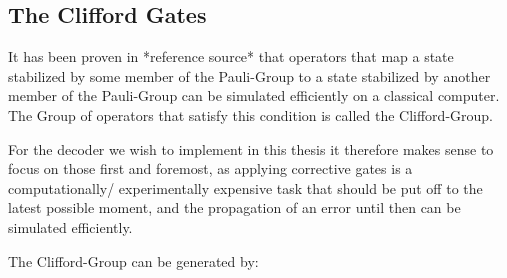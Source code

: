 \subsection{The Clifford Gates}

It has been proven in *reference source* that operators that 
map a state stabilized by some member of the Pauli-Group to 
a state stabilized by another member of the Pauli-Group can be simulated efficiently
on a classical computer. The Group of operators that satisfy
this condition is called the Clifford-Group.

For the decoder we wish to implement in
this thesis it therefore makes sense to focus on those first and
foremost, as applying corrective gates is a computationally/
experimentally expensive task that should be put off to the latest
possible moment, and the propagation of an error until then can be
simulated efficiently. 

The Clifford-Group can be generated by:

